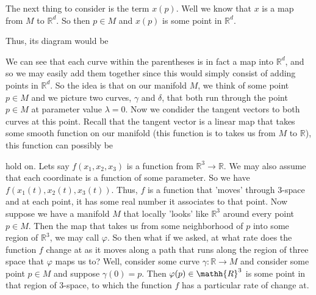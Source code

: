 \documentclass[12pt, a4paper]{article}
\begin{document}
\vspace{6mm}


\hspace{45mm}


\vspace{5mm}


\hspace{45mm}

\newpage


The next thing to consider is the term $x(p)$. Well we know that $x$ is a map from $M$ to $\mathbb{R}^d$. So then $p\in M$ and $x(p)$ is some point in $\mathbb{R}^d$. 

Thus, its diagram would be\par

\vspace{5mm}



\vspace{5mm}
We can see that each curve within the parentheses is in fact a map into $\mathbb{R}^d$, and so we may easily add them together since this would simply consist of adding points in $\mathbb{R}^d$. So the idea is that on our manifold $M$, we think of some point $p\in M$ and we picture two curves, $\gamma$ and $\delta$, that both run through the point $p\in M$ at parameter value $\lambda=0$. Now we condider the tangent vectors to both curves at this point. Recall that the tangent vector is a linear map that takes some smooth function on our manifold (this function is to takes us from $M$ to $\mathbb{R}$), this function can possibly be 

\vspace{6mm}

hold on. Lets say $f(x_1, x_2, x_3)$ is a function from $\mathbb{R}^3\rightarrow\mathbb{R}$. We may also assume that each coordinate is a function of some parameter. So we have $f(x_1(t), x_2(t), x_3(t))$. Thus, $f$ is a function that 'moves' through 3-space and at each point, it has some real number it associates to that point. Now suppose we have a manifold $M$ that locally 'looks' like $\mathbb{R}^3$ around every point $p\in M$. Then the map that takes us from some neighborhood of $p$ into some region of $\mathbb{R}^3$, we may call $\varphi$. So then what if we asked, at what rate does the function $f$ change at as it moves along a path that runs along the region of three space that $\varphi$ maps us to? Well, consider some curve $\gamma\colon \mathbb{R}\rightarrow M$ and consider some point $p\in M$ and suppose $\gamma(0)=p$. Then $\varphi(p)\in\mathh{R}^3$ is some point in that region of 3-space, to which the function $f$ has a particular rate of change at.
\end{document}
